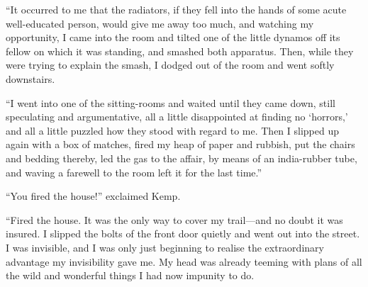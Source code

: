 “It occurred to me that the radiators, if they fell into the hands of some acute well-educated person, would give me away too much, and watching my opportunity, I came into the room and tilted one of the little dynamos off its fellow on which it was standing, and smashed both apparatus. Then, while they were trying to explain the smash, I dodged out of the room and went softly downstairs.

“I went into one of the sitting-rooms and waited until they came down, still speculating and argumentative, all a little disappointed at finding no ‘horrors,’ and all a little puzzled how they stood with regard to me. Then I slipped up again with a box of matches, fired my heap of paper and rubbish, put the chairs and bedding thereby, led the gas to the affair, by means of an india-rubber tube, and waving a farewell to the room left it for the last time.”

“You fired the house!” exclaimed Kemp.

“Fired the house. It was the only way to cover my trail—and no doubt it was insured. I slipped the bolts of the front door quietly and went out into the street. I was invisible, and I was only just beginning to realise the extraordinary advantage my invisibility gave me. My head was already teeming with plans of all the wild and wonderful things I had now impunity to do.